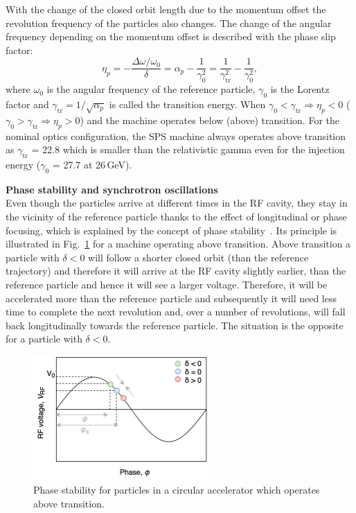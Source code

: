 With the change of the closed orbit length due to the momentum offset the revolution frequency of the particles also changes. The change of the angular frequency depending on the momentum offset is described with the phase slip factor:
\begin{equation}\label{eq:phase_slip_factor}
    \eta_p = -\frac{\Delta \omega / \omega_0}{\delta} = \alpha_p - \frac{1}{\gamma^2_0} = \frac{1}{\gamma^2_\mathrm{tr}} - \frac{1}{\gamma^2_0},
\end{equation}
where $\omega_0$ is the angular frequency of the reference particle, $\gamma_0$ is the Lorentz factor and $\gamma_\mathrm{tr} = 1/\sqrt{\alpha_p}$ is called the transition energy. When $\gamma_0 < \gamma_\mathrm{tr} \Rightarrow \eta_p <0$ ($\gamma_0 > \gamma_\mathrm{tr} \Rightarrow \eta_p > 0$) and the machine operates below (above) transition. For the nominal optics configuration, the SPS machine always operates above transition as $\gamma_\mathrm{tr}$ = 22.8 which is smaller than the relativistic gamma even for the injection energy ($\gamma_0$ = 27.7 at 26\,GeV).

\textbf{Phase stability and synchrotron oscillations}\\
Even though the particles arrive at different times in the RF cavity, they stay in the vicinity of the reference particle thanks to the effect of longitudinal or phase focusing, which is explained by the concept of phase stability~\cite{McMillan:1945zz, Veksler_1, Veksler_2}. Its principle is illustrated in Fig.~\ref{fig:phase_focusing} for a machine operating above transition. Above transition a particle with $\delta<0$ will follow a shorter closed orbit (than the reference trajectory) and therefore it will arrive at the RF cavity slightly earlier, than the reference particle and hence it will see a larger voltage. Therefore, it will be accelerated more than the reference particle and subsequently it will need less time to complete the next revolution and, over a number of revolutions, will fall back longitudinally towards the reference particle. The situation is the opposite for a particle with $\delta<0$. 
\begin{figure}[!h] %
    \centering         
    \includegraphics[width=0.6\textwidth]{images/Ch2/phase_focusing_synchrotron_motion.png}
        \caption{Phase stability for particles in a circular accelerator which operates above transition.}
        \label{fig:phase_focusing}
 \end{figure}

